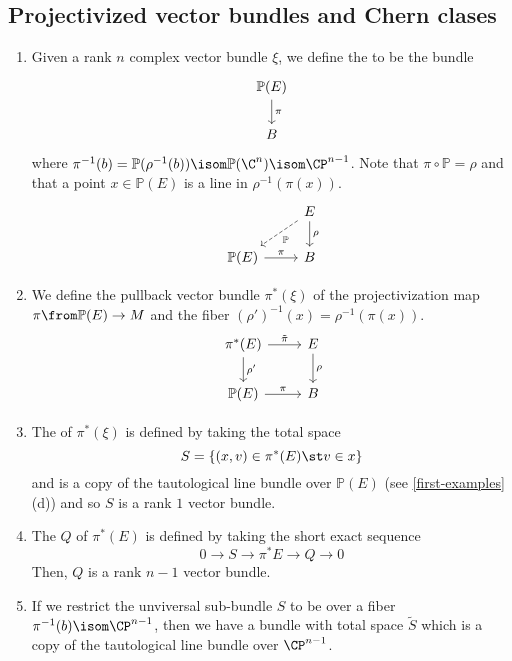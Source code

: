 \documentclass[11pt,leqno,oneside]{amsbook}
\renewcommand{\P}{\mathbb{P}}
\numberwithin{thm}{section}
\begin{document}
\subsection{Projectivized vector bundles and Chern clases}
\begin{defn}\label{projectivization}
  \begin{enumerate}
  \item Given a rank \(n\) complex vector bundle \(\xi\), we define
    the \de{projectivized bundle \(\P(\xi)\)} to be the
    bundle \[
      \begin{tikzcd}
        \P(E) \ar[d, "\pi"] \\
        B
      \end{tikzcd}
    \]
    where \(\pi^{-1}(b) = \P(\rho^{-1}(b)) \isom \P(\C^n) \isom \CP^{n-1}\). Note that
    \(\pi \circ \P = \rho\) and that a point \(x \in \P(E)\) is a
    line in \(\rho^{-1}(\pi(x))\). \[
      \begin{tikzcd}
        & E \ar[d, "\rho"] \ar[ld, dashed, "\P"]\\
      \P(E) \ar[r, "\pi"] & B
      \end{tikzcd}
    \]
   \item We define the pullback vector bundle \(\pi^*(\xi)\) of the
     projectivization map 
    \(\pi \from \P(E) \to M\) and the
    fiber \((\rho')^{-1}(x) = \rho^{-1}(\pi(x))\). \[
      \begin{tikzcd}
        \pi^*(E) \ar[r,"\tilde{\pi}"] \ar[d, "\rho'"] & E
        \ar[d,"\rho"] \\ 
        \P(E) \ar[r, "\pi"] & B
      \end{tikzcd}
    \]
  \item The  of \(\pi^*(\xi)\) is defined by
    taking the total space \[
      S = \{(x,v) \in \pi^*(E) \st v \in x\} 
    \]
    and is a copy of the tautological line bundle over \(\P(E)\) (see
    \ref{first-examples}(d)) and so \(S\) is a rank \(1\) vector
    bundle.
  \item The  \(Q\) of \(\pi^*(E)\) is
    defined by taking the short exact sequence \[
      0 \to S \to \pi^*E \to Q \to 0
    \]
    Then, \(Q\) is a rank \(n-1\) vector bundle.
  \item If we restrict the unviversal sub-bundle \(S\) to be over a
    fiber \(\pi^{-1}(b) \isom \CP^{n-1}\), then we have a bundle with
    total space \(\tilde{S}\) which is a copy of the tautological
    line bundle over \(\CP^{n-1}\).
  \end{enumerate}
\end{defn}
\end{document}
